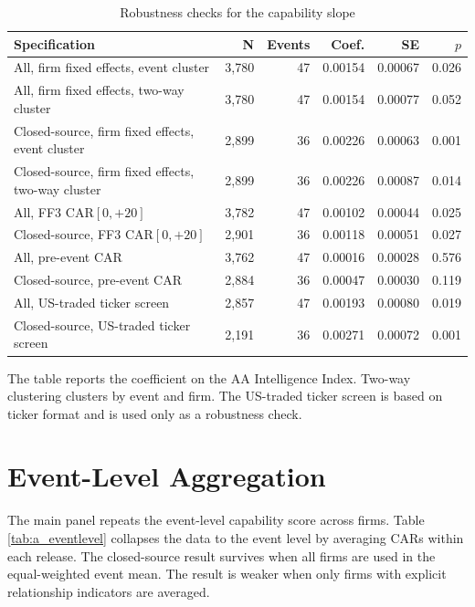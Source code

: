 \documentclass[12pt]{article}
\begin{document}
\begin{table}[htbp]
\centering
\caption{Robustness checks for the capability slope}
\label{tab:a_robust}
\begin{threeparttable}
\small
\begin{tabular}{lrrrrr}
\toprule
Specification & N & Events & Coef. & SE & $p$ \\
\midrule
All, firm fixed effects, event cluster & 3,780 & 47 & 0.00154 & 0.00067 & 0.026 \\
All, firm fixed effects, two-way cluster & 3,780 & 47 & 0.00154 & 0.00077 & 0.052 \\
Closed-source, firm fixed effects, event cluster & 2,899 & 36 & 0.00226 & 0.00063 & 0.001 \\
Closed-source, firm fixed effects, two-way cluster & 2,899 & 36 & 0.00226 & 0.00087 & 0.014 \\
All, FF3 CAR$[0,{+}20]$ & 3,782 & 47 & 0.00102 & 0.00044 & 0.025 \\
Closed-source, FF3 CAR$[0,{+}20]$ & 2,901 & 36 & 0.00118 & 0.00051 & 0.027 \\
All, pre-event CAR & 3,762 & 47 & 0.00016 & 0.00028 & 0.576 \\
Closed-source, pre-event CAR & 2,884 & 36 & 0.00047 & 0.00030 & 0.119 \\
All, US-traded ticker screen & 2,857 & 47 & 0.00193 & 0.00080 & 0.019 \\
Closed-source, US-traded ticker screen & 2,191 & 36 & 0.00271 & 0.00072 & 0.001 \\
\bottomrule
\end{tabular}
\begin{tablenotes}[flushleft]\footnotesize
\item The table reports the coefficient on the AA Intelligence Index. Two-way
clustering clusters by event and firm. The US-traded ticker screen is based on
ticker format and is used only as a robustness check.
\end{tablenotes}
\end{threeparttable}
\end{table}

\section{Event-Level Aggregation}
\label{app:eventlevel}

The main panel repeats the event-level capability score across firms. Table
\ref{tab:a_eventlevel} collapses the data to the event level by averaging CARs
within each release. The closed-source result survives when all firms are used in
the equal-weighted event mean. The result is weaker when only firms with explicit
relationship indicators are averaged.
\end{document}
